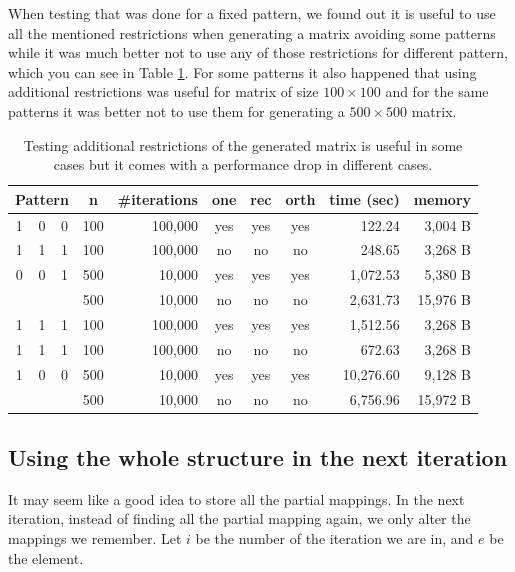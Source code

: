 When testing that was done for a fixed pattern, we found out it is useful to use all the mentioned restrictions when generating a matrix avoiding some patterns while it was much better not to use any of those restrictions for different pattern, which you can see in Table \ref{approachestable}. For some patterns it also happened that using additional restrictions was useful for matrix of size $100\times100$ and for the same patterns it was better not to use them for generating a $500\times500$ matrix.
\begin{table}[]
\centering
\begin{tabular}{|ccc|c|r|c|c|c|r|r|}
\hline
\multicolumn{3}{|c|}{\textbf{Pattern}} & \textbf{n} & \textbf{\#iterations} & \textbf{one} & \textbf{rec} & \textbf{orth} & \textbf{time (sec)} & \textbf{memory} \\ \hline
1 & 0 & 0 & 100 & 100,000 & yes & yes & yes & 122.24 & 3,004 B \\ \cline{4-10} 
1 & 1 & 1 & 100 & 100,000 & no & no & no & 248.65 & 3,268 B \\ \cline{4-10} 
0 & 0 & 1 & 500 & 10,000 & yes & yes & yes & 1,072.53 & 5,380 B \\ \cline{4-10} 
  &   &   & 500 & 10,000 & no & no & no & 2,631.73 & 15,976 B \\ \hline
1 & 1 & 1 & 100 & 100,000 & yes & yes & yes & 1,512.56 & 3,268 B \\ \cline{4-10}
1 & 1 & 1 & 100 & 100,000 & no & no & no & 672.63 & 3,268 B \\ \cline{4-10} 
1 & 0 & 0 & 500 & 10,000 & yes & yes & yes & 10,276.60 & 9,128 B \\ \cline{4-10} 
  &   &   & 500 & 10,000 & no & no & no & 6,756.96 & 15,972 B \\ \hline
\end{tabular}
\caption{Testing additional restrictions of the generated matrix is useful in some cases but it comes with a performance drop in different cases.}
\label{approachestable}
\end{table}

\subsection{Using the whole structure in the next iteration}
\label{wholestructure}
It may seem like a good idea to store all the partial mappings. In the next iteration, instead of finding all the partial mapping again, we only alter the mappings we remember. Let $i$ be the number of the iteration we are in, and $e$ be the element.

